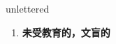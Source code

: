 
\begin{frame}
{\huge unlettered}
\begin{center}
\begin{enumerate}\Large
  \item \textbf{未受教育的，文盲的}
\end{enumerate}
\end{center}
\end{frame}
